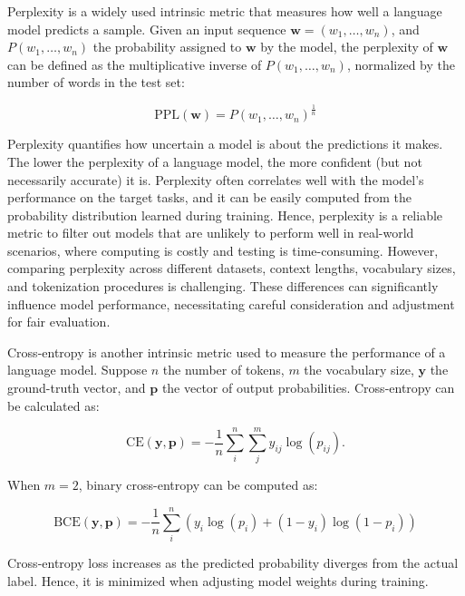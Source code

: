 Perplexity is a widely used intrinsic metric that measures how well a language model predicts a sample. Given an input sequence $\bm{w} = (w_1, \ldots, w_n)$, and $P(w_1, \ldots, w_n)$ the probability assigned to $\bm{w}$ by the model, the perplexity of $\bm{w}$ can be defined as the multiplicative inverse of $P(w_1, \ldots, w_n)$, normalized by the number of words in the test set:

\begin{equation}
    \text{PPL}(\bm{w}) = P(w_1, \ldots, w_n)^{\frac{1}{n}}
\end{equation}

Perplexity quantifies how uncertain a model is about the predictions it makes. The lower the perplexity of a language model, the more confident (but not necessarily accurate) it is. Perplexity often correlates well with the model's performance on the target tasks, and it can be easily computed from the probability distribution learned during training. Hence, perplexity is a reliable metric to filter out models that are unlikely to perform well in real-world scenarios, where computing is costly and testing is time-consuming. However, comparing perplexity across different datasets, context lengths, vocabulary sizes, and tokenization procedures is challenging. These differences can significantly influence model performance, necessitating careful consideration and adjustment for fair evaluation.

Cross-entropy is another intrinsic metric used to measure the performance of a language model. Suppose $n$ the number of tokens, $m$ the vocabulary size, $\bm{y}$ the ground-truth vector, and $\bm{p}$ the vector of output probabilities. Cross-entropy can be calculated as:

\begin{equation}
    \text{CE}(\bm{y}, \bm{p}) = - \dfrac{1}{n} \sum_{i}^n \sum_{j}^m y_{ij} \log (p_{ij}).
\end{equation}

\noindent When $m = 2$, binary cross-entropy can be computed as:

\begin{equation}
    \text{BCE}(\bm{y}, \bm{p}) = - \dfrac{1}{n} \sum_{i}^n (y_i \log(p_i) + (1-y_i) \log (1-p_i))
\end{equation}

\noindent Cross-entropy loss increases as the predicted probability diverges from the actual label. Hence, it is minimized when adjusting model weights during training. 

